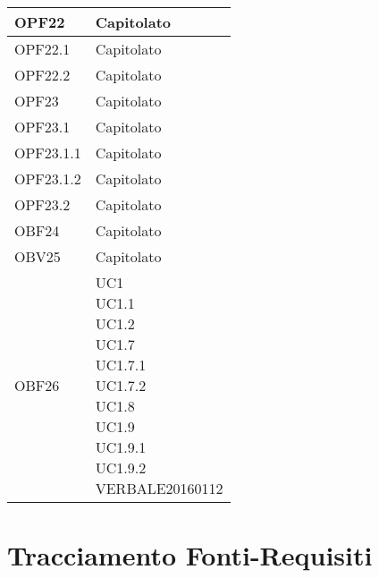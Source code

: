 \documentclass{scalatekids-article}
\begin{document}
\begin{longtable}[H]{|p{5.5cm}|p{5.5cm}|}
  \hline
  OPF22 & \multiLineCell[t]{Capitolato\\}\\
  \hline
  OPF22.1 & \multiLineCell[t]{Capitolato\\}\\
  \hline
  OPF22.2 & \multiLineCell[t]{Capitolato\\}\\
  \hline
  OPF23 & \multiLineCell[t]{Capitolato\\}\\
  \hline
  OPF23.1 & \multiLineCell[t]{Capitolato\\}\\
  \hline
  OPF23.1.1 & \multiLineCell[t]{Capitolato\\}\\
  \hline
  OPF23.1.2 & \multiLineCell[t]{Capitolato\\}\\
  \hline
  OPF23.2 & \multiLineCell[t]{Capitolato\\}\\
  \hline
  OBF24 & \multiLineCell[t]{Capitolato\\}\\
  \hline
  OBV25 & \multiLineCell[t]{Capitolato\\}\\
  \hline
  OBF26 & \multiLineCell[t]{UC1\\UC1.1\\UC1.2\\UC1.7\\UC1.7.1\\UC1.7.2\\UC1.8\\UC1.9\\UC1.9.1\\UC1.9.2\\VERBALE20160112\\}\\
  \hline
\end{longtable}
\newpage

\section{Tracciamento Fonti-Requisiti}
\end{document}

